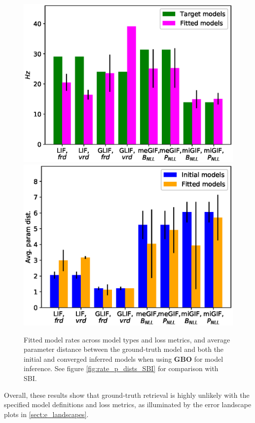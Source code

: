 \documentclass[mphil,deptreport,ianc]{infthesis} %
\begin{document}
\begin{figure}
    \centering
    \vspace{-0.1in}
	\includegraphics[width=0.8\columnwidth]{figures/export_rates_saved_all.eps}
	\includegraphics[width=0.8\columnwidth]{figures/export_p_dists_saved_all.eps}
	\vspace{-0.1in}
	\caption{Fitted model rates across model types and loss metrics, and average parameter distance between the ground-truth model and both the initial and converged inferred models when using \textbf{GBO} for model inference. See figure \ref{fig:rate_p_dists_SBI} for comparison with SBI.}
	\label{fig:rate_p_dists_GBO}
\end{figure}

Overall, these results show that ground-truth retrieval is highly unlikely with the specified model definitions and loss metrics, as illuminated by the error landscape plots in \ref{sect:e_landscapes}.
\end{document}
